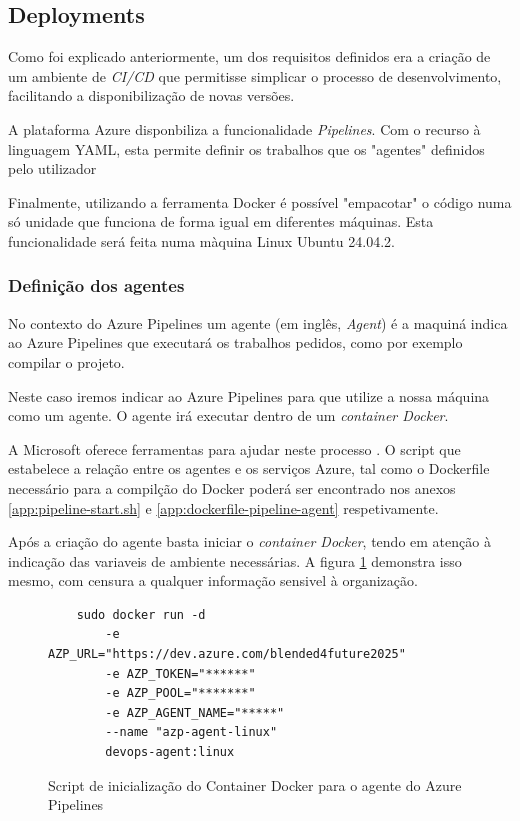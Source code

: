 \subsection{Deployments}

Como foi explicado anteriormente, um dos requisitos definidos  era a criação de um ambiente de \textit{CI/CD} que permitisse simplicar o processo de desenvolvimento, facilitando a disponibilização de novas versões.

A plataforma Azure disponbiliza a funcionalidade \textit{Pipelines}. Com o recurso à linguagem YAML, esta permite definir os trabalhos que os "agentes" definidos pelo utilizador

Finalmente, utilizando a ferramenta Docker é possível "empacotar" o código numa só unidade que funciona de forma igual em diferentes máquinas. Esta funcionalidade será feita numa màquina Linux Ubuntu 24.04.2. 

\subsubsection{Definição dos agentes}

No contexto do Azure Pipelines um agente (em inglês, \textit{Agent}) é a maquiná indica ao Azure Pipelines que executará os trabalhos pedidos, como por exemplo compilar o projeto. 

Neste caso iremos indicar ao Azure Pipelines para que utilize a nossa máquina como um agente. O agente irá executar dentro de um \textit{container Docker}.

A Microsoft oferece ferramentas para ajudar neste processo \cite{run-a-self-hosted-agent-in-docker}. O script que estabelece a relação entre os agentes e os serviços Azure, tal como o Dockerfile necessário para a compilção do Docker poderá ser encontrado nos anexos \ref{app:pipeline-start.sh} e \ref{app:dockerfile-pipeline-agent} respetivamente.

Após a criação do agente basta iniciar o \textit{container Docker}, tendo em atenção à indicação das variaveis de ambiente necessárias. A figura \ref{fig:start-docker-agent} demonstra isso mesmo, com censura a qualquer informação sensivel à organização.

\begin{figure}[h!tbp]
    

\begin{lstlisting}
    sudo docker run -d 
        -e AZP_URL="https://dev.azure.com/blended4future2025" 
        -e AZP_TOKEN="******" 
        -e AZP_POOL="*******" 
        -e AZP_AGENT_NAME="*****" 
        --name "azp-agent-linux" 
        devops-agent:linux
\end{lstlisting}


\caption{Script de inicialização do Container Docker para o agente do Azure Pipelines}
\label{fig:start-docker-agent}

\end{figure}

